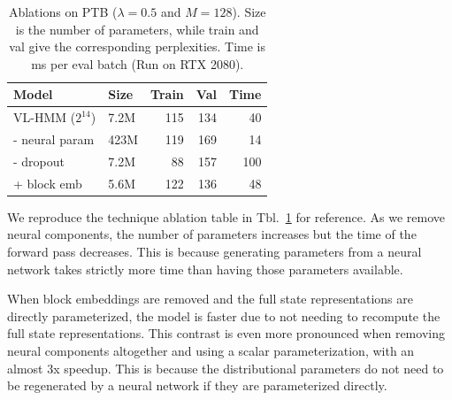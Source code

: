 \documentclass[11pt,a4paper]{article}
\begin{document}
\begin{table}[t]
\centering
\begin{tabular}{llrrr}
\toprule
Model                & Size & Train  & Val & Time \\
\midrule
VL-HMM ($2^{14}$)    & 7.2M & 115    & 134 & 40\\
\quad - neural param & 423M & 119    & 169 & 14\\
\quad - dropout      & 7.2M & 88     & 157 & 100\\
\quad + block emb    & 5.6M & 122    & 136 & 48\\
\bottomrule
\end{tabular}
\caption{\label{tbl:dropout-param-ablation-repeat}
Ablations on \textsc{PTB} ($\lambda =0.5$ and $M=128$). Size is the number of parameters, while train and val give the corresponding perplexities.
Time is ms per eval batch (Run on RTX 2080).
}
\end{table}

We reproduce the technique ablation table in
Tbl.~\ref{tbl:dropout-param-ablation-repeat} for reference.
As we remove neural components, 
the number of parameters increases but the time of the
forward pass decreases.
This is because generating parameters from a neural network
takes strictly more time than having those parameters available.

When block embeddings are removed and the full state representations are
directly parameterized,
the model is faster due to not needing to recompute the full state representations.
This contrast is even more pronounced when removing neural components altogether and using a scalar parameterization, with an almost 3x speedup. This is because the distributional parameters do not need to be regenerated by a neural network if they are parameterized directly.
    
\end{document}
